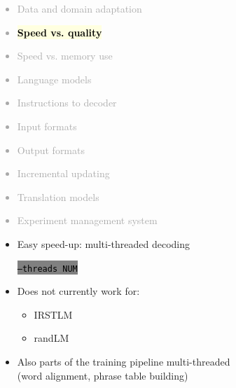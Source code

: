 \documentclass[landscape]{uedslides2C}
\newcommand{\currenttopic}[1]{\colorbox{lightyellow}{\textcolor{black}{\bf #1}}}
\newcommand{\littlecode}[1]{\colorbox{gray}{\textcolor{black}{\small \tt #1}}}
\begin{document}
\vspace{-5mm}
\textcolor{darkgrey}{
\begin{itemize} \itemsep -1mm
\item Data and domain adaptation
\item \currenttopic{Speed vs. quality}
\item Speed vs. memory use
\item Language models
\item Instructions to decoder
\item Input formats
\item Output formats
\item Incremental updating
\item Translation models
\item Experiment management system
\end{itemize}
}


\vspace{15mm}
\begin{itemize}
\item Easy speed-up: multi-threaded decoding
\begin{center}
\littlecode{--threads NUM}
\end{center}
\item Does not currently work for:
\begin{itemize}
\item IRSTLM
\item randLM
\end{itemize}
\item Also parts of the training pipeline multi-threaded\\ (word alignment, phrase table building)
\end{itemize}


\end{document}
